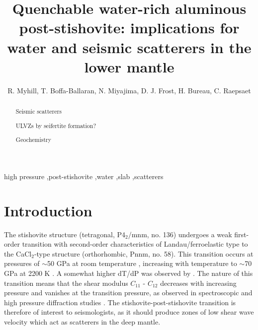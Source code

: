 \documentclass[review]{elsarticle}
\begin{document}
\begin{frontmatter}

\title{Quenchable water-rich aluminous post-stishovite: implications for water and seismic scatterers in the lower mantle}

\author{R. Myhill, T. Boffa-Ballaran, N. Miyajima, D. J. Frost, H. Bureau, C. Raepsaet}
\address{Bayerisches Geoinstitut, Universit\"{a}t Bayreuth, Universit\"{a}tsstrasse 30, 95447 Bayreuth, Germany}

\begin{abstract}
  Seismic scatterers

  ULVZs by seifertite formation?

  Geochemistry
\end{abstract}

\begin{keyword}
high pressure \sep post-stishovite \sep water \sep slab \sep scatterers
\end{keyword}

\end{frontmatter}

\linenumbers

\section{Introduction}

The stishovite structure (tetragonal, P4$_2$/mnm, no. 136) undergoes a weak first-order transition \citep{AFGH1998, HSCHMK2000} with second-order characteristics of Landau/ferroelastic type \citep{TY1989, CHM2000} to the CaCl$_2$-type structure (orthorhombic, Pnnm, no. 58). This transition occurs at pressures of $\sim$50 GPa at room temperature \citep{KCHM1995, AFGH1998}, increasing with temperature to $\sim$70 GPa at 2200 K \citep{HTSO2005,Nomuraetal2010}. A somewhat higher dT/dP was observed by \cite{OHMI2002}. The nature of this transition means that the shear modulus $C_{11}$ - $C_{12}$ decreases with increasing pressure and vanishes at the transition pressure, as observed in spectroscopic and high pressure diffraction studies \citep{KCHM1995, SDL2002}. The stishovite-post-stishovite transition is therefore of interest to seismologists, as it should produce zones of low shear wave velocity which act as scatterers in the deep mantle.
\end{document}
